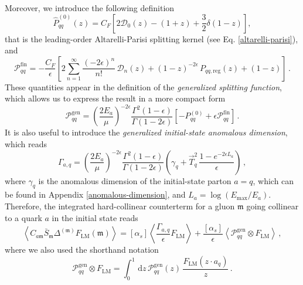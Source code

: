 \documentclass[a4paper, 12pt]{book}
\newcommand{\um}{\mathfrak{m}}
\begin{document}
Moreover, we introduce the following definition
\begin{equation}
  \hat{P}_{qq}^{(0)}(z) = C_F \left[ 2 \mathcal{D}_0 (z)-(1+z)+\frac{3}{2} \delta(1-z) \right],
  \label{kernel-pqq}
\end{equation}
that is the leading-order Altarelli-Parisi splitting kernel (see Eq. \ref{altarelli-parisi}), and
\begin{equation}
  \mathcal{P}_{qq}^{\mathrm{fin}}= - \frac{C_F}{\epsilon} \left[2 \sum_{n=1}^{\infty} \frac{(-2\epsilon)^n}{n!} \, \mathcal{D}_n(z)+(1-z)^{-2\epsilon} \, P_{qq, \mathrm{reg}}(z)+(1-z) \right] \, .
  \label{P-qq-finite}
\end{equation}
These quantities appear in the definition of the \emph{generalized splitting function}, which allows us to express the result in a more compact form
\begin{equation}
  \mathcal{P}_{qq}^{\mathrm{gen}} = \left(\frac{2E_a}{\mu}\right)^{-2\epsilon} \frac{\Gamma^2(1-\epsilon)}{\Gamma(1-2\epsilon)} \left[-P^{(0)}_{qq}+\epsilon \mathcal{P}_{qq}^{\mathrm{fin}}\right] \, .
  \label{gen-splitt-funct}
\end{equation}
It is also useful to introduce the \emph{generalized initial-state anomalous dimension}, which reads
\begin{equation}
  \Gamma_{a,q} = \left(\frac{2E_a}{\mu}\right)^{-2\epsilon} \frac{\Gamma^2(1-\epsilon)}{\Gamma(1-2\epsilon)} \left(\gamma_q + \vec{T}_q^2 \,\frac{1-e^{-2\epsilon L_a}}{\epsilon}\right) \, ,
  \label{generalized-anom-dim}
\end{equation}
where $\gamma_q$ is the anomalous dimension of the initial-state parton $a=q$, which can be found in Appendix \ref{anomalous-dimension}, and $L_a =\log{(E_{\mathrm{max}}/E_a)}$. Therefore, the integrated hard-collinear counterterm for a gluon $\um$ going collinear to a quark $a$ in the initial state reads
\begin{equation}
  \left< C_{a\um} \bar{S}_\um \Delta^{(\um)} F_{\mathrm{LM}} (\um) \right> = [\alpha_s] \left< \frac{\Gamma_{a,q}}{\epsilon} F_{\mathrm{LM}} \right> + \frac{[\alpha_s]}{\epsilon}\left< \mathcal{P}_{qq}^{\mathrm{gen}} \otimes F_{\mathrm{LM}} \right> \, ,
  \label{initial-state-collinear}
\end{equation}
where we also used the shorthand notation
\begin{equation}
  \mathcal{P}_{qq}^{\mathrm{gen}} \otimes F_{\mathrm{LM}} = \int_0^1 \, \mathrm{d}z \, \mathcal{P}_{qq}^{\mathrm{gen}}(z) \, \frac{F_{\mathrm{LM}}(z \cdot a_q)}{z} \, .
  \label{convolution}
\end{equation}
\end{document}
